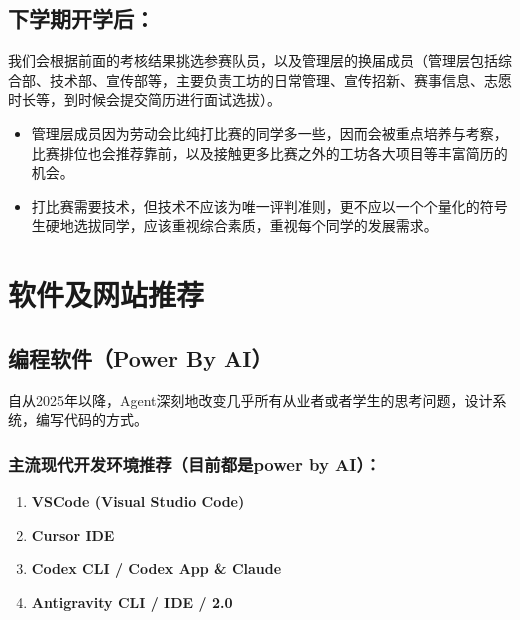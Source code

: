 \documentclass[a4paper,11pt,oneside]{scrreprt}
\begin{document}
\section*{下学期开学后：}
{}

我们会根据前面的考核结果挑选参赛队员，以及管理层的换届成员（管理层包括综合部、技术部、宣传部等，主要负责工坊的日常管理、宣传招新、赛事信息、志愿时长等，到时候会提交简历进行面试选拔）。

\begin{itemize}
    \item 管理层成员因为劳动会比纯打比赛的同学多一些，因而会被重点培养与考察，比赛排位也会推荐靠前，以及接触更多比赛之外的工坊各大项目等丰富简历的机会。
    \item 打比赛需要技术，但技术不应该为唯一评判准则，更不应以一个个量化的符号生硬地选拔同学，应该重视综合素质，重视每个同学的发展需求。
\end{itemize}

\chapter{软件及网站推荐}
\enlargethispage{2\baselineskip}

\section{编程软件（Power By AI）}

自从2025年以降，Agent深刻地改变几乎所有从业者或者学生的思考问题，设计系统，编写代码的方式。

\subsection*{主流现代开发环境推荐（目前都是power by AI）：}
{}

\begin{enumerate}
    \item \textbf{VSCode (Visual Studio Code)}
    \item \textbf{Cursor IDE}
    \item \textbf{Codex CLI / Codex App \& Claude}
    \item \textbf{Antigravity CLI / IDE / 2.0}
\end{enumerate}
\end{document}
